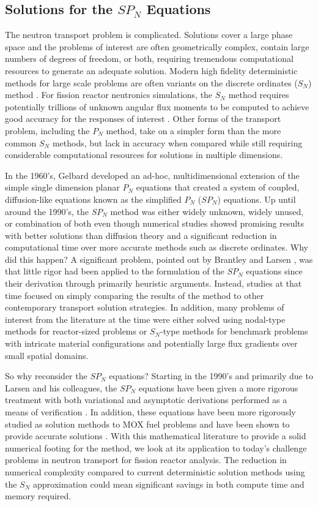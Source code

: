 \subsection{Solutions for the $SP_N$ Equations}
\label{subsec:spn_motiviation}
The neutron transport problem is complicated. Solutions cover a large
phase space and the problems of interest are often geometrically
complex, contain large numbers of degrees of freedom, or both,
requiring tremendous computational resources to generate an adequate
solution. Modern high fidelity deterministic methods for large scale
problems are often variants on the discrete ordinates ($S_N$) method
\cite{evans_denovo:_2010}. For fission reactor neutronics simulations,
the $S_N$ method requires potentially trillions of unknown angular
flux moments to be computed to achieve good accuracy for the responses
of interest \cite{slaybaugh_acceleration_2011}. Other forms of the
transport problem, including the $P_N$ method, take on a simpler form
than the more common $S_N$ methods, but lack in accuracy when compared
while still requiring considerable computational resources for
solutions in multiple dimensions.

In the 1960's, Gelbard developed an ad-hoc, multidimensional extension
of the simple single dimension planar $P_N$ equations that created a
system of coupled, diffusion-like equations known as the simplified
$P_N$ ($SP_N$) equations. Up until around the 1990's, the $SP_N$
method was either widely unknown, widely unused, or combination of
both even though numerical studies showed promising results with
better solutions than diffusion theory and a significant reduction in
computational time over more accurate methods such as discrete
ordinates. Why did this happen? A significant problem, pointed out by
Brantley and Larsen \cite{brantley_simplified_2000}, was that little
rigor had been applied to the formulation of the $SP_N$ equations
since their derivation through primarily heuristic arguments. Instead,
studies at that time focused on simply comparing the results of the
method to other contemporary transport solution strategies. In
addition, many problems of interest from the literature at the time
were either solved using nodal-type methods for reactor-sized problems
or $S_N$-type methods for benchmark problems with intricate material
configurations and potentially large flux gradients over small spatial
domains.

So why reconsider the $SP_N$ equations? Starting in the 1990's and
primarily due to Larsen and his colleagues, the $SP_N$ equations have
been given a more rigorous treatment with both variational and
asymptotic derivations performed as a means of verification
\cite{olbrant_asymptotic_2013}. In addition, these equations have been
more rigorously studied as solution methods to MOX fuel problems and
have been shown to provide accurate solutions
\cite{brantley_simplified_2000}. With this mathematical literature to
provide a solid numerical footing for the method, we look at its
application to today's challenge problems in neutron transport for
fission reactor analysis. The reduction in numerical complexity
compared to current deterministic solution methods using the $S_N$
approximation could mean significant savings in both compute time and
memory required.

